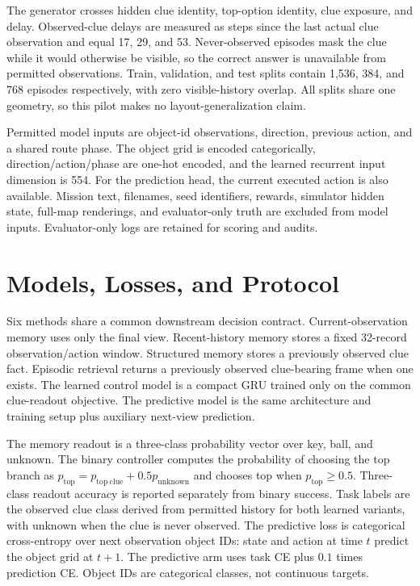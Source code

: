 \documentclass[11pt]{article}
\begin{document}
The generator crosses hidden clue identity, top-option identity, clue exposure, and delay. Observed-clue delays are measured as steps since the last actual clue observation and equal 17, 29, and 53. Never-observed episodes mask the clue while it would otherwise be visible, so the correct answer is unavailable from permitted observations. Train, validation, and test splits contain 1,536, 384, and 768 episodes respectively, with zero visible-history overlap. All splits share one geometry, so this pilot makes no layout-generalization claim.

Permitted model inputs are object-id observations, direction, previous action, and a shared route phase. The object grid is encoded categorically, direction/action/phase are one-hot encoded, and the learned recurrent input dimension is 554. For the prediction head, the current executed action is also available. Mission text, filenames, seed identifiers, rewards, simulator hidden state, full-map renderings, and evaluator-only truth are excluded from model inputs. Evaluator-only logs are retained for scoring and audits.

\section{Models, Losses, and Protocol}

Six methods share a common downstream decision contract. Current-observation memory uses only the final view. Recent-history memory stores a fixed 32-record observation/action window. Structured memory stores a previously observed clue fact. Episodic retrieval returns a previously observed clue-bearing frame when one exists. The learned control model is a compact GRU trained only on the common clue-readout objective. The predictive model is the same architecture and training setup plus auxiliary next-view prediction.

The memory readout is a three-class probability vector over key, ball, and unknown. The binary controller computes the probability of choosing the top branch as $p_{\mathrm{top}} = p_{\mathrm{top\ clue}} + 0.5p_{\mathrm{unknown}}$ and chooses top when $p_{\mathrm{top}}\geq 0.5$. Three-class readout accuracy is reported separately from binary success. Task labels are the observed clue class derived from permitted history for both learned variants, with unknown when the clue is never observed. The predictive loss is categorical cross-entropy over next observation object IDs: state and action at time $t$ predict the object grid at $t+1$. The predictive arm uses task CE plus $0.1$ times prediction CE. Object IDs are categorical classes, not continuous targets.
\end{document}
